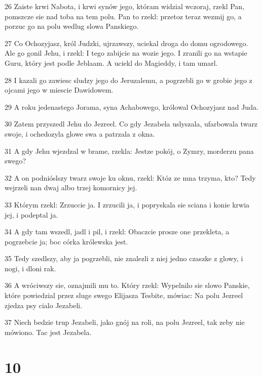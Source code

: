 \par 26 Zaiste krwi Nabota, i krwi synów jego, któram widzial wczoraj, rzekl Pan, pomszcze sie nad toba na tem polu. Pan to rzekl: przetoz teraz wezmij go, a porzuc go na polu wedlug slowa Panskiego.
\par 27 Co Ochozyjasz, król Judzki, ujrzawszy, uciekal droga do domu ogrodowego. Ale go gonil Jehu, i rzekl: I tego zabijcie na wozie jego. I zranili go na wstapie Guru, który jest podle Jeblaam. A uciekl do Magieddy, i tam umarl.
\par 28 I kazali go zawiesc sludzy jego do Jeruzalemu, a pogrzebli go w grobie jego z ojcami jego w miescie Dawidowem.
\par 29 A roku jedenastego Jorama, syna Achabowego, królowal Ochozyjasz nad Juda.
\par 30 Zatem przyszedl Jehu do Jezreel. Co gdy Jezabela uslyszala, ufarbowala twarz swoje, i ochedozyla glowe swa a patrzala z okna.
\par 31 A gdy Jehu wjezdzal w brame, rzekla: Jestze pokój, o Zymry, morderzu pana swego?
\par 32 A on podnióslszy twarz swoje ku oknu, rzekl: Któz ze mna trzyma, kto? Tedy wejrzeli nan dwaj albo trzej komornicy jej.
\par 33 Którym rzekl: Zrzuccie ja. I zrzucili ja, i popryskala sie sciana i konie krwia jej, i podeptal ja.
\par 34 A gdy tam wszedl, jadl i pil, i rzekl: Obaczcie prosze one przekleta, a pogrzebcie ja; boc córka królewska jest.
\par 35 Tedy szedlszy, aby ja pogrzebli, nie znalezli z niej jedno czaszke z glowy, i nogi, i dloni rak.
\par 36 A wróciwszy sie, oznajmili mu to. Który rzekl: Wypelnilo sie slowo Panskie, które powiedzial przez sluge swego Elijasza Tesbite, mówiac: Na polu Jezreel zjedza psy cialo Jezabeli.
\par 37 Niech bedzie trup Jezabeli, jako gnój na roli, na polu Jezreel, tak zeby nie mówiono. Tac jest Jezabela.

\chapter{10}

